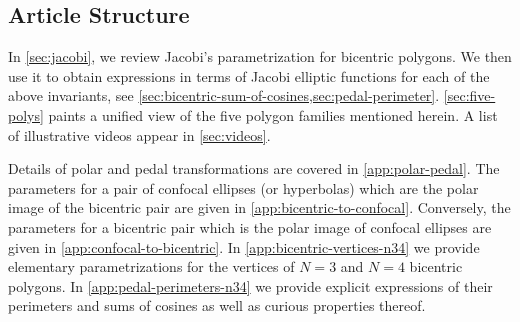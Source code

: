
\subsection*{Article Structure}
In \cref{sec:jacobi}, we review Jacobi's parametrization for bicentric polygons. We then use it to obtain expressions in terms of Jacobi elliptic functions for each of the above invariants, see \cref{sec:bicentric-sum-of-cosines,sec:pedal-perimeter}. \cref{sec:five-polys} paints a unified view of the five polygon families mentioned herein. A list of illustrative videos appear in \cref{sec:videos}. 

Details of polar and pedal transformations are covered in \cref{app:polar-pedal}. The parameters for a pair of confocal ellipses (or hyperbolas) which are the polar image of the bicentric pair are given in \cref{app:bicentric-to-confocal}. Conversely, the parameters for a bicentric pair which is the polar image of confocal ellipses are given in
\cref{app:confocal-to-bicentric}. In \cref{app:bicentric-vertices-n34} we provide elementary parametrizations for the vertices of $N=3$ and $N=4$ bicentric polygons. In \cref{app:pedal-perimeters-n34} we provide explicit expressions of their perimeters and sums of cosines as well as curious properties thereof.



